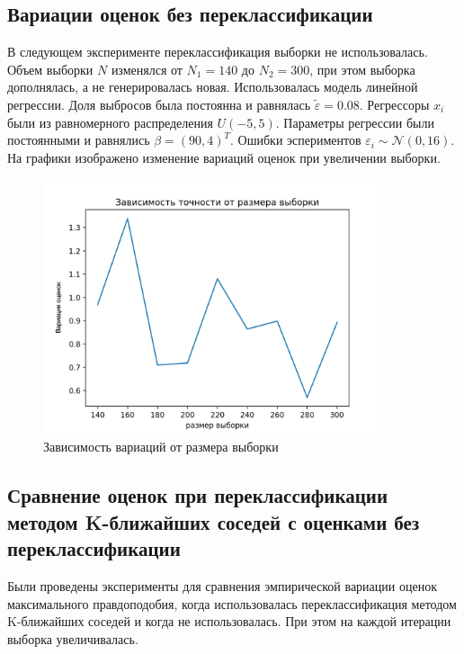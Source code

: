 \subsection{Вариации оценок без переклассификации}
В следующем эксперименте переклассификация выборки не использовалась. 
Объем выборки $N$ изменялся от $N_1=140$ до $N_2=300$, при этом выборка дополнялась, а не генерировалась новая. Использовалась модель линейной регрессии. Доля выбросов была постоянна и равнялась $\widetilde{\varepsilon}=0.08$. 
Регрессоры $x_i$ были из равномерного распределения $U(-5,5)$.  Параметры регрессии были постоянными и равнялись $\beta=(90,4)^T$. Ошибки эспериментов $\varepsilon_i\sim \mathcal{N}(0,16)$.
На графики изображено изменение вариаций оценок при увеличении выборки.
\begin{figure}[hb]
    \centering
    \includegraphics[width=100mm]{../images/plot_90_4_accuracy-samplesize.png}
    \caption{Зависимость вариаций от размера выборки\label{overflow}}
    \label{pic6}
\end{figure}

\subsection{Сравнение оценок при переклассификации методом K-ближайших соседей с оценками без переклассификации}
Были проведены эксперименты для сравнения эмпирической вариации оценок максимального правдоподобия, когда использовалась переклассификация методом K-ближайших соседей и когда не использовалась. При этом на каждой итерации выборка увеличивалась. 

